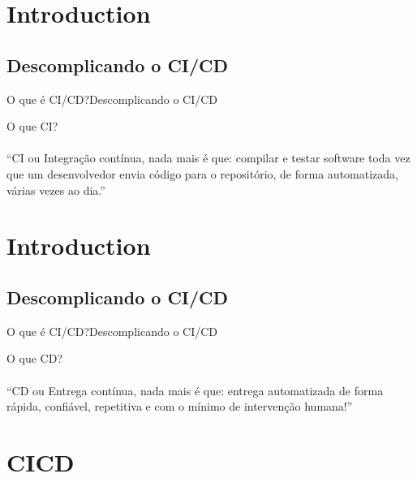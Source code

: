 \documentclass[10pt]{beamer}
\begin{document}
\section{Introduction}
\subsection{Descomplicando o CI/CD}
\begin{frame}{O que é CI/CD?}{Descomplicando o CI/CD}
    \begin{center}
      O que CI? \\~\\ ``CI ou Integração contínua, nada mais é que: compilar e testar software toda vez que um desenvolvedor envia código para o repositório, de forma automatizada, várias vezes ao dia.''
    \end{center}
\end{frame}

\section{Introduction}
\subsection{Descomplicando o CI/CD}
\begin{frame}{O que é CI/CD?}{Descomplicando o CI/CD}
    \begin{center}
      O que CD? \\~\\ ``CD ou Entrega contínua, nada mais é que: entrega automatizada de forma rápida, confiável, repetitiva e com o mínimo de intervenção humana!''
    \end{center}
\end{frame}

\section{CICD}
\end{document}
